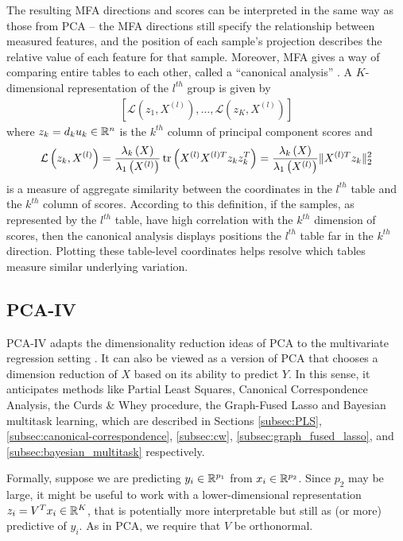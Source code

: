 \documentclass{article}
\begin{document}
The resulting MFA directions and scores can be interpreted in the same
way as those from PCA -- the MFA directions still specify the
relationship between measured features, and the position of each
sample's projection describes the relative value of each feature for
that sample. Moreover, MFA gives a way of comparing entire tables to
each other, called a ``canonical analysis'' \citep{pages2004multiple}. A
$K$-dimensional representation of the $l^{th}$ group is given by
\begin{align*}
\left[\mathcal{L}\left(z_{1}, X^{(l)}\right), \dots,
  \mathcal{L}\left(z_{K}, X^{(l)}\right)\right]
\end{align*}
where $z_{k} = d_{k}u_{k} \in \mathbb{R}^{n}$ is the $k^{th}$ column of principal
component scores and
\begin{align*}
  \mathcal{L}\left(z_{k}, X^{(l)}\right) =
  \frac{\lambda_{k}\left(X\right)}{\lambda_{1}\left(X^{(l)}\right)}\mathop\mathrm{tr}\left(X^{(l)}X^{(l)
      T} z_{k}z_{k}^{T}\right) =
  \frac{\lambda_{k}\left(X\right)}{\lambda_{1}\left(X^{(l)}\right)}\|X^{(l)
  T} z_{k}\|^{2}_{2}
\end{align*}
is a measure of aggregate similarity between the coordinates in the $l^{th}$
table and the $k^{th}$ column of scores. According to this definition, if the
samples, as represented by the $l^{th}$ table, have high correlation with the
$k^{th}$ dimension of scores, then the canonical analysis displays positions the
$l^{th}$ table far in the $k^{th}$ direction. Plotting these table-level
coordinates helps resolve which tables measure similar underlying variation.

\subsection{PCA-IV}
\label{subsec:pcaiv}

PCA-IV adapts the dimensionality reduction ideas of PCA to the multivariate
regression setting \citep{rao1964use}. It can also be viewed as a version of PCA
that chooses a dimension reduction of $X$ based on its ability to predict $Y$.
In this sense, it anticipates methods like Partial Least Squares, Canonical
Correspondence Analysis, the Curds \& Whey procedure, the Graph-Fused Lasso and
Bayesian multitask learning, which are described in Sections \ref{subsec:PLS},
\ref{subsec:canonical-correspondence}, \ref{subsec:cw},
\ref{subsec:graph_fused_lasso}, and \ref{subsec:bayesian_multitask}
respectively.

Formally, suppose we are predicting $y_{i} \in \mathbb{R}^{p_{1}}$ from $x_{i} \in
\mathbb{R}^{p_{2}}$. Since $p_{2}$ may be large, it might be useful to work with a
lower-dimensional representation $z_{i} = V^{T}x_{i} \in \mathbb{R}^{K}$, that is
potentially more interpretable but still as (or more) predictive of $y_{i}$. As
in PCA, we require that $V$ be orthonormal.
\end{document}
